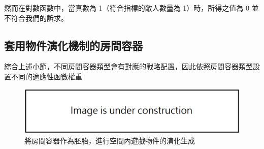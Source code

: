 然而在對數函數中，當真數為 1（符合指標的敵人數量為 1）時，所得之值為 0 並不符合我們的訴求。

\subsection{套用物件演化機制的房間容器}
\label{ssec:method-segments-appliedonvolumes}

綜合上述小節，不同房間容器類型會有對應的戰略配置，因此依照房間容器類型設置不同的適應性函數權重

\begin{figure}[ht]
  \begin{center}
    \includegraphics[width=1.0\textwidth]{figures/under_construction.png}
    \caption{將房間容器作為胚胎，進行空間內遊戲物件的演化生成} 
    \label{fig:applied-ga-on-volume}
  \end{center}
\end{figure}











